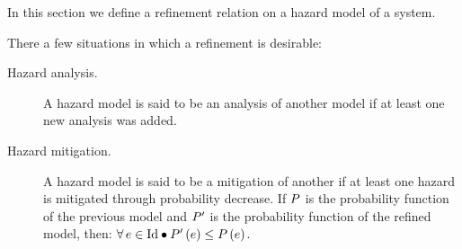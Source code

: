 In this section we define a refinement relation on a hazard model of a system.


There a few situations in which a refinement is desirable:
\begin{description}
  \item[Hazard analysis.] A hazard model is said to be an analysis of another model if at least one new analysis was added.
  \item[Hazard mitigation.] A hazard model is said to be a mitigation of another if at least one hazard is mitigated through probability decrease. If $P$ is the probability function of the previous model and $P'$ is the probability function of the refined model, then: 
%
$\hmforall{e \in \hmdatatypeId}{\hmprobability[\hmprobabilitysymbol']{e}\leq\hmprobability{e}}$.
\end{description}

